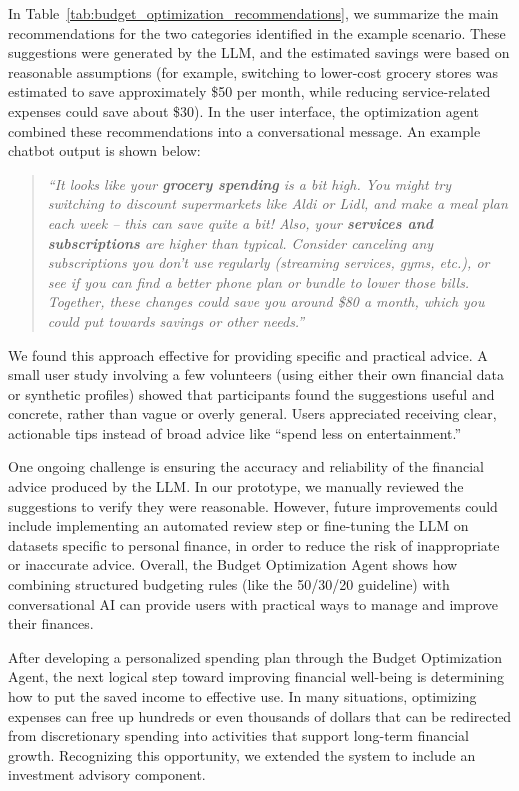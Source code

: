 \documentclass[conference]{IEEEtran}
\begin{document}
In Table~\ref{tab:budget_optimization_recommendations}, we summarize the main recommendations for the two categories identified in the example scenario. These suggestions were generated by the LLM, and the estimated savings were based on reasonable assumptions (for example, switching to lower-cost grocery stores was estimated to save approximately \$50 per month, while reducing service-related expenses could save about \$30). In the user interface, the optimization agent combined these recommendations into a conversational message. An example chatbot output is shown below:

\begin{quote}
\textit{“It looks like your \textbf{grocery spending} is a bit high. You might try switching to discount supermarkets like Aldi or Lidl, and make a meal plan each week – this can save quite a bit! Also, your \textbf{services and subscriptions} are higher than typical. Consider canceling any subscriptions you don’t use regularly (streaming services, gyms, etc.), or see if you can find a better phone plan or bundle to lower those bills. Together, these changes could save you around \$80 a month, which you could put towards savings or other needs.”}
\end{quote}

We found this approach effective for providing specific and practical advice. A small user study involving a few volunteers (using either their own financial data or synthetic profiles) showed that participants found the suggestions useful and concrete, rather than vague or overly general. Users appreciated receiving clear, actionable tips instead of broad advice like “spend less on entertainment.”

One ongoing challenge is ensuring the accuracy and reliability of the financial advice produced by the LLM. In our prototype, we manually reviewed the suggestions to verify they were reasonable. However, future improvements could include implementing an automated review step or fine-tuning the LLM on datasets specific to personal finance, in order to reduce the risk of inappropriate or inaccurate advice. Overall, the Budget Optimization Agent shows how combining structured budgeting rules (like the 50/30/20 guideline) with conversational AI can provide users with practical ways to manage and improve their finances.

After developing a personalized spending plan through the Budget Optimization Agent, the next logical step toward improving financial well-being is determining how to put the saved income to effective use. In many situations, optimizing expenses can free up hundreds or even thousands of dollars that can be redirected from discretionary spending into activities that support long-term financial growth. Recognizing this opportunity, we extended the system to include an investment advisory component. 
\end{document}
